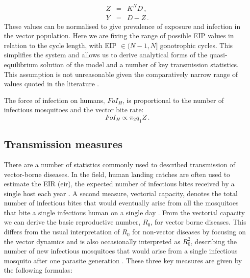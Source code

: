 \begin{eqnarray}
Z &=& K^ND\,,\\
Y &=& D - Z\,.
\end{eqnarray}
These values can be normalised to give prevalence of exposure and infection in the vector population. Here we are fixing the range of possible EIP values in relation to the cycle length, with EIP $\in (N-1,N]$ gonotrophic cycles. This simplifies the system and allows us to derive analytical forms of the quasi-equilibrium solution of the model and a number of key transmission statistics. This assumption is not unreasonable given the comparatively narrow range of values quoted in the literature \cite{erickson2009}.

The force of infection on humans, $FoI_H$, is proportional to the number of infectious mosquitoes and the vector bite rate:
\begin{equation}
FoI_H \propto \pi_2q_1Z\,.
\end{equation}

\subsection{Transmission measures}
\label{sec:EpiMeasures}

There are a number of statistics commonly used to described transmission of vector-borne diseases. In the field, human landing catches are often used to estimate the \gls{EIR} (\acrshort{eir}), the expected number of infectious bites received by a single host each year \cite{Kilama2014}. A second measure, vectorial capacity, denotes the total number of infectious bites that would eventually arise from all the mosquitoes that bite a single infectious human on a single day \cite{Smith2010}. From the vectorial capacity we can derive the basic reproductive number, $R_0$, for vector borne diseases. This differs from the usual interpretation of $R_0$ for non-vector diseases by focusing on the vector dynamics and is also occasionally interpreted as $R_0^2$, describing the number of new infectious mosquitoes that would arise from a single infectious mosquito after one parasite generation \cite{Smith2010}. These three key measures are given by the following formulas:

